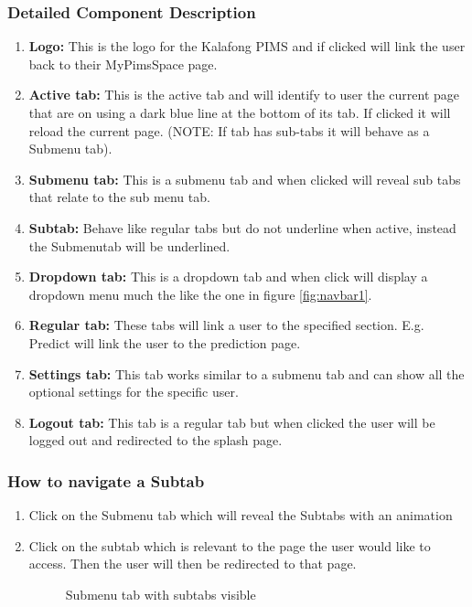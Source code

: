 \documentclass[14pt, a4paper]{article}
\begin{document}
\subsubsection{Detailed Component Description}
\begin{enumerate}
\item \textbf{Logo:} This is the logo for the Kalafong PIMS and if clicked will link the user back to their MyPimsSpace page.
\item \textbf{Active tab:} This is the active tab and will identify to user the current page that are on using a dark blue line at the bottom of its tab. If clicked it will reload the current page. (NOTE: If tab has sub-tabs it will behave as a Submenu tab).
\item \textbf{Submenu tab:} This is a submenu tab and when clicked will reveal sub tabs that relate to the sub menu tab.
\item \textbf{Subtab:} Behave like regular tabs but do not underline when active, instead the Submenutab will be underlined.
\item \textbf{Dropdown tab: } This is a dropdown tab and when click will display a dropdown menu much the like the one in figure \ref{fig:navbar1}.
\item \textbf{Regular tab: } These tabs will link a user to the specified section. E.g. Predict will link the user to the prediction page.
\item \textbf{Settings tab:} This tab works similar to a submenu tab and can show all the optional settings for the specific user.
\item \textbf{Logout tab:} This tab is a regular tab but when clicked the user will be logged out and redirected to the splash page.
\end{enumerate}
\subsubsection{How to navigate a Subtab}
\begin{enumerate}
\item Click on the Submenu tab which will reveal the Subtabs with an animation
\item Click on the subtab which is relevant to the page the user would like to access. Then the user will then be redirected to that page.
\begin{figure}[H]
\centerline{}
\caption{Submenu tab with subtabs visible}
\label{fig:navbar2}
\end{figure}
\end{enumerate}
\end{document}
